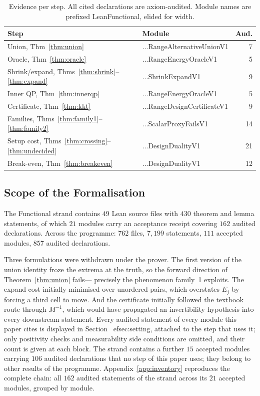 \documentclass[conference]{IEEEtran}
\theoremstyle{definition}
\newcommand{\lean}[1]{\textsf{\footnotesize #1}}
\begin{document}
\begin{table}[htbp]
\caption{Evidence per step. All cited declarations are axiom-audited. Module names are
prefixed \lean{LeanFunctional}, elided for width.}
\label{tab:inventory}
\centering\footnotesize\setlength{\tabcolsep}{3pt}
\begin{tabular}{@{}llr@{}}
\toprule
Step & Module & Aud. \\
\midrule
Union, Thm~\ref{thm:union}              & \lean{...RangeAlternativeUnionV1}  &  7 \\
Oracle, Thm~\ref{thm:oracle}            & \lean{...RangeEnergyOracleV1}      &  5 \\
Shrink/expand, Thms~\ref{thm:shrink}--\ref{thm:expand} & \lean{...ShrinkExpandV1} & 9 \\
Inner QP, Thm~\ref{thm:innerqp}         & \lean{...RangeEnergyOracleV1}      &  5 \\
Certificate, Thm~\ref{thm:kkt}          & \lean{...RangeDesignCertificateV1} &  9 \\
Families, Thms~\ref{thm:family1}--\ref{thm:family2} & \lean{...ScalarProxyFailsV1} & 14 \\
Setup cost, Thms~\ref{thm:crossing}--\ref{thm:undecided} & \lean{...DesignDualityV1} & 21 \\
Break-even, Thm~\ref{thm:breakeven}     & \lean{...DesignDualityV1}          & 12 \\
\bottomrule
\end{tabular}
\end{table}

\subsection{Scope of the Formalisation}

The Functional strand contains $49$ Lean source files with $430$ theorem and lemma
statements, of which $21$ modules carry an acceptance receipt covering $162$ audited
declarations. Across the programme: $762$ files, $7{,}199$ statements, $111$ accepted modules,
$857$ audited declarations.

Three formulations were withdrawn under the prover. The first version of the union identity
froze the extrema at the truth, so the forward direction of Theorem~\ref{thm:union} fails---
precisely the phenomenon family~1 exploits. The expand cost initially minimised over unordered
pairs, which overstates $E_{j}$ by forcing a third cell to move. And the certificate initially
followed the textbook route through $M^{-1}$, which would have propagated an invertibility
hypothesis into every downstream statement. Every audited statement of every module this paper cites is displayed in Section~
ef{sec:setting}, attached to the step that uses it; only positivity checks and measurability side conditions are omitted, and their count is given at each block. The strand contains a further $15$ accepted modules carrying $106$ audited declarations that no step of this paper uses; they belong to other results of the programme. Appendix~\ref{app:inventory} reproduces the complete chain: all $162$ audited statements of the strand across its $21$ accepted modules, grouped by module.
\end{document}
